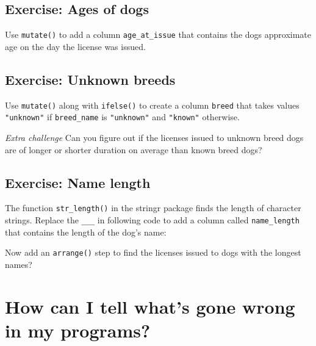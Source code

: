 \documentclass[]{Nemilov}
\newenvironment{Shaded}{\begin{snugshade}}{\end{snugshade}}
\newcommand{\DataTypeTok}[1]{\textcolor[rgb]{0.13,0.29,0.53}{#1}}
\newcommand{\KeywordTok}[1]{\textcolor[rgb]{0.13,0.29,0.53}{\textbf{#1}}}
\newcommand{\NormalTok}[1]{#1}
\newcommand{\OperatorTok}[1]{\textcolor[rgb]{0.81,0.36,0.00}{\textbf{#1}}}
\newcommand{\StringTok}[1]{\textcolor[rgb]{0.31,0.60,0.02}{#1}}
\begin{document}
\hypertarget{exercise-ages-of-dogs}{%
\subsection{Exercise: Ages of dogs}\label{exercise-ages-of-dogs}}

Use \texttt{mutate()} to add a column \texttt{age\_at\_issue} that contains the dogs approximate age on the day the license was issued.

\hypertarget{exercise-unknown-breeds}{%
\subsection{Exercise: Unknown breeds}\label{exercise-unknown-breeds}}

Use \texttt{mutate()} along with \texttt{ifelse()} to create a column \texttt{breed} that takes values \texttt{"unknown"} if \texttt{breed\_name} is \texttt{"unknown"} and \texttt{"known"} otherwise.

\emph{Extra challenge} Can you figure out if the licenses issued to unknown breed dogs are of longer or shorter duration on average than known breed dogs?

\hypertarget{exercise-name-length}{%
\subsection{Exercise: Name length}\label{exercise-name-length}}

The function \texttt{str\_length()} in the stringr package finds the length of character strings. Replace the \texttt{\_\_\_} in following code to add a column called \texttt{name\_length} that contains the length of the dog's name:

\begin{Shaded}
\end{Shaded}

Now add an \texttt{arrange()} step to find the licenses issued to dogs with the longest names?

\hypertarget{how-can-i-tell-whats-gone-wrong-in-my-programs}{%
\section{How can I tell what's gone wrong in my programs?}\label{how-can-i-tell-whats-gone-wrong-in-my-programs}}
\end{document}
